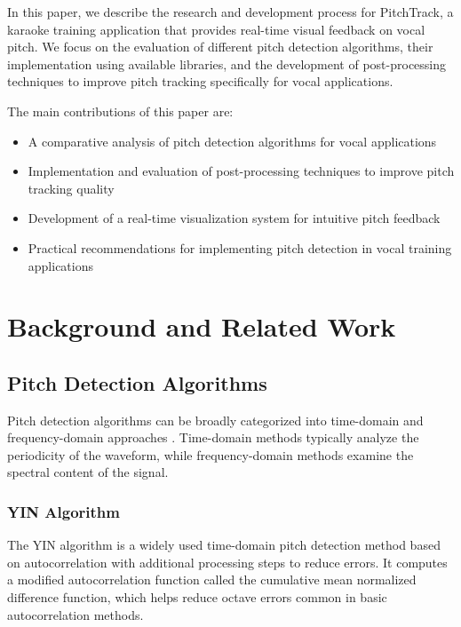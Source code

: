 \documentclass[conference]{IEEEtran}
\begin{document}
In this paper, we describe the research and development process for PitchTrack, a karaoke training application that provides real-time visual feedback on vocal pitch. We focus on the evaluation of different pitch detection algorithms, their implementation using available libraries, and the development of post-processing techniques to improve pitch tracking specifically for vocal applications.

The main contributions of this paper are:
\begin{itemize}
    \item A comparative analysis of pitch detection algorithms for vocal applications
    \item Implementation and evaluation of post-processing techniques to improve pitch tracking quality
    \item Development of a real-time visualization system for intuitive pitch feedback
    \item Practical recommendations for implementing pitch detection in vocal training applications
\end{itemize}

\section{Background and Related Work}

\subsection{Pitch Detection Algorithms}
Pitch detection algorithms can be broadly categorized into time-domain and frequency-domain approaches \cite{gerhard2003pitch}. Time-domain methods typically analyze the periodicity of the waveform, while frequency-domain methods examine the spectral content of the signal.

\subsubsection{YIN Algorithm}
The YIN algorithm \cite{cheveigne2002yin} is a widely used time-domain pitch detection method based on autocorrelation with additional processing steps to reduce errors. It computes a modified autocorrelation function called the cumulative mean normalized difference function, which helps reduce octave errors common in basic autocorrelation methods.
\end{document}
